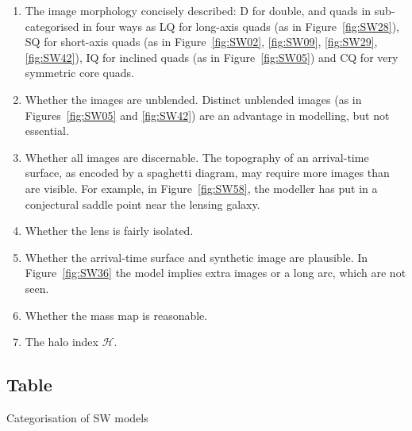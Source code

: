 \documentclass[fleqn,usenatbib]{mnras}
\newcommand{\figref}[1]{\ref{fig:#1}}
\newcommand{\haloindex}{\mathcal{H}}
\begin{document}
\begin{enumerate}
\item The image morphology concisely described: D for double, and
  quads in sub-categorised in four ways
  \citep[cf.][]{2003AJ....125.2769S} as LQ for long-axis quads (as in
  Figure~\figref{SW28}), SQ for short-axis quads (as in
  Figure~\figref{SW02}, \figref{SW09}, \figref{SW29}, \figref{SW42}),
  IQ for inclined quads (as in Figure~\figref{SW05}) and CQ for very
  symmetric core quads.
\item Whether the images are unblended.  Distinct unblended images (as
  in Figures~\figref{SW05} and \figref{SW42}) are an advantage in
  modelling, but not essential.
\item Whether all images are discernable.  The topography of an
  arrival-time surface, as encoded by a spaghetti diagram, may require
  more images than are visible.  For example, in Figure~\figref{SW58},
  the modeller has put in a conjectural saddle point near the lensing
  galaxy.
\item Whether the lens is fairly isolated.
\item Whether the arrival-time surface and synthetic image are
  plausible.  In Figure~\figref{SW36} the model implies extra images
  or a long arc, which are not seen.
\item Whether the mass map is reasonable.
\item The halo index $\haloindex$.
\end{enumerate}

\subsection{Table}

\begin{table}
  \caption{Categorisation of SW models}
  \label{tab:models}
  
\end{table}





\end{document}
